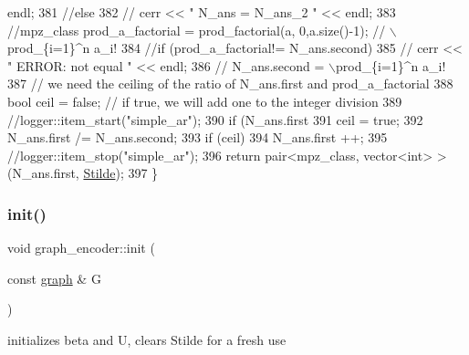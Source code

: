 \begin{DoxyCode}
{       endl;}
381   \textcolor{comment}{//else}
382   \textcolor{comment}{//  cerr << " N\_ans = N\_ans\_2 " << endl;}
383   \textcolor{comment}{//mpz\_class prod\_a\_factorial = prod\_factorial(a, 0,a.size()-1); // \(\backslash\)prod\_\{i=1\}^n a\_i!}
384   \textcolor{comment}{//if (prod\_a\_factorial!= N\_ans.second)}
385   \textcolor{comment}{//  cerr << " ERROR: not equal " << endl;}
386   \textcolor{comment}{// N\_ans.second = \(\backslash\)prod\_\{i=1\}^n a\_i!}
387   \textcolor{comment}{// we need the ceiling of the ratio of N\_ans.first and prod\_a\_factorial}
388   \textcolor{keywordtype}{bool} ceil = \textcolor{keyword}{false}; \textcolor{comment}{// if true, we will add one to the integer division}
389   \textcolor{comment}{//logger::item\_start("simple\_ar");}
390   \textcolor{keywordflow}{if} (N\_ans.first %
391     ceil = \textcolor{keyword}{true};
392   N\_ans.first /= N\_ans.second;
393   \textcolor{keywordflow}{if} (ceil)
394     N\_ans.first ++;
395   \textcolor{comment}{//logger::item\_stop("simple\_ar");}
396   \textcolor{keywordflow}{return} pair<mpz\_class, vector<int> > (N\_ans.first, \hyperlink{classgraph__encoder_a342688a3fdee511b7fae3f155cfb10cf}{Stilde});
397 \}
\end{DoxyCode}
\mbox{\label{classgraph__encoder_a6cfb6fca4bc50d4e5d267060a91f43c3}} 
\subsubsection{\texorpdfstring{init()}{init()}}
{\footnotesize\ttfamily void graph\+\_\+encoder\+::init (\begin{DoxyParamCaption}\item[{const \hyperlink{classgraph}{graph} \&}]{G }\end{DoxyParamCaption})}



initializes beta and U, clears Stilde for a fresh use 


